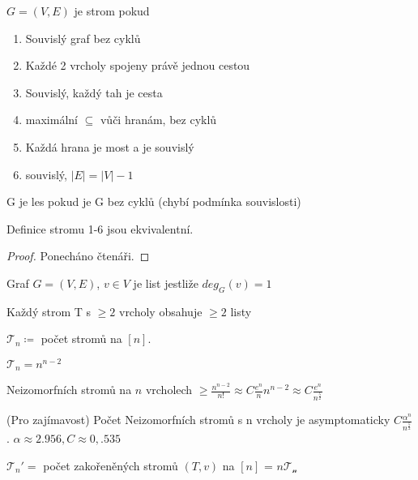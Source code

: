 \documentclass[../main.tex]{subfiles}
\begin{document}
\begin{definition}
    $G=(V,E)$ je strom pokud
\begin{enumerate}
    \item Souvislý graf bez cyklů
    \item Každé 2 vrcholy spojeny právě jednou cestou
    \item Souvislý, každý tah je cesta
    \item maximální $\subseteq$ vůči hranám, bez cyklů
    \item Každá hrana je most a je souvislý
    \item souvislý, $|E| = |V|-1$
\end{enumerate}
\end{definition}

\begin{definition}
    G je les pokud je G bez cyklů (chybí podmínka souvislosti)
\end{definition}

\begin{theorem}
    Definice stromu 1-6 jsou ekvivalentní.
\end{theorem}

\begin{proof}
    Ponecháno čtenáři. 
\end{proof}

\begin{definition}
    Graf $G=(V,E)$, $v\in V$ je list jestliže $deg_G(v) = 1$
\end{definition}

\begin{lemma}
    Každý strom T s $\geq 2$ vrcholy obsahuje  $\geq 2$ listy
\end{lemma}

\begin{definition}
    $\mathcal{T}_n \coloneq $ počet stromů na $[n]$.
\end{definition}

\begin{theorem}[Caley]
    $\mathcal{T}_n = n^{n-2}$
\end{theorem}

\begin{corollary}
    Neizomorfních stromů na $n$ vrcholech $\geq \frac{n^{n-2}}{n!} \approx C \frac{e^n}{n} n^{n-2} \approx C \frac{e^n}{n^{\frac{5}{2}}} $
\end{corollary}

\begin{theorem}
    (Pro zajímavost) Počet Neizomorfních stromů s n vrcholy je asymptomaticky $C\frac{\alpha^n}{n^{\frac{5}{2}}}$. $\alpha\approx2.956, C\approx0,.535$
\end{theorem}

\begin{definition}
    $\mathcal{T}_n' = $ počet zakořeněných stromů $(T, v)$ na $[n]$ = $n \mathcal{T_n}$
\end{definition}
\end{document}
